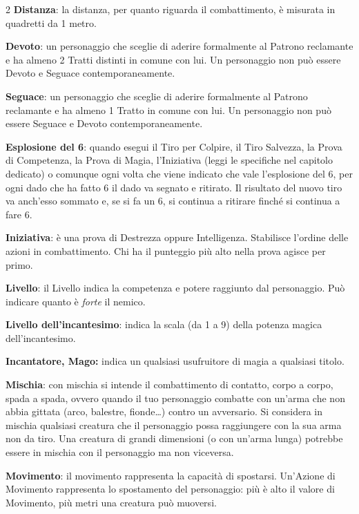 \begin{multicols}{2}
\textbf{Distanza}: la distanza, per quanto riguarda il combattimento, è misurata in quadretti da 1 metro.

\textbf{Devoto}: un personaggio che sceglie di aderire formalmente al Patrono reclamante e ha almeno 2 Tratti distinti in comune con lui. Un personaggio non può essere Devoto e Seguace contemporaneamente.

\textbf{Seguace}: un personaggio che sceglie di aderire formalmente al Patrono reclamante e ha almeno 1 Tratto in comune con lui. Un personaggio non può essere Seguace e Devoto contemporaneamente.

\textbf{Esplosione del 6}: quando esegui il Tiro per Colpire, il Tiro Salvezza, la Prova di Competenza, la Prova di Magia, l'Iniziativa (leggi le specifiche nel capitolo dedicato) o comunque ogni volta che viene indicato che vale l'esplosione del 6, per ogni dado che ha fatto 6 il dado va segnato e ritirato. Il risultato del nuovo tiro va anch'esso sommato e, se si fa un 6, si continua a ritirare finché si continua a fare 6.

\textbf{Iniziativa}: è una prova di Destrezza oppure Intelligenza. Stabilisce l'ordine delle azioni in combattimento. Chi ha il punteggio più alto nella prova agisce per primo.

\textbf{Livello}: il Livello indica la competenza e potere raggiunto dal personaggio. Può indicare quanto è \emph{forte} il nemico.

\textbf{Livello dell'incantesimo}: indica la scala (da 1 a 9) della potenza magica dell'incantesimo.

\textbf{Incantatore, Mago:} indica un qualsiasi usufruitore di magia a qualsiasi titolo.

\textbf{Mischia}: con mischia si intende il combattimento di contatto, corpo a corpo, spada a spada, ovvero quando il tuo personaggio combatte con un'arma che non abbia gittata (arco, balestre, fionde…) contro un avversario.
Si considera in mischia qualsiasi creatura che il personaggio possa raggiungere con la sua arma non da tiro. Una creatura di grandi dimensioni (o con un'arma lunga) potrebbe essere in mischia con il personaggio ma non viceversa.

\textbf{Movimento}: il movimento rappresenta la capacità di spostarsi. Un'Azione di Movimento rappresenta lo spostamento del personaggio: più è alto il valore di Movimento, più metri una creatura può muoversi.


\end{multicols}
